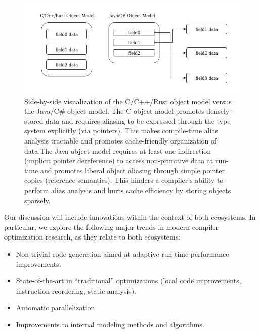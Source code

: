 \documentclass[nobib]{tufte-handout}
\begin{document}
\begin{figure}
\centering
\includegraphics[width=\linewidth]{images/SideBySideObjectModel.png}
\caption{Side-by-side visualization of the C/C++/Rust object model versus the Java/C\# object model.  The C object model promotes densely-stored data and requires aliasing to be expressed through the type system explicitly (via pointers).  This makes compile-time alias analysis tractable and promotes cache-friendly organization of data.\newline The Java object model requires at least one indirection (implicit pointer dereference) to access non-primitive data at run-time and promotes liberal object aliasing through simple pointer copies (reference semantics).  This hinders a compiler's ability to perform alias analysis and hurts cache efficiency by storing objects sparsely.}
\end{figure}



Our discussion will include innovations within the context of both ecosystems.  In particular, we explore the following major trends in modern compiler optimization research, as they relate to both ecosystems:
\begin{itemize}
\item Non-trivial code generation aimed at adaptive run-time performance improvements.
\item State-of-the-art in ``traditional'' optimizations (local code improvements, instruction reordering, static analysis).
\item Automatic parallelization.
\item Improvements to internal modeling methods and algorithms.
\end{itemize}



\end{document}
